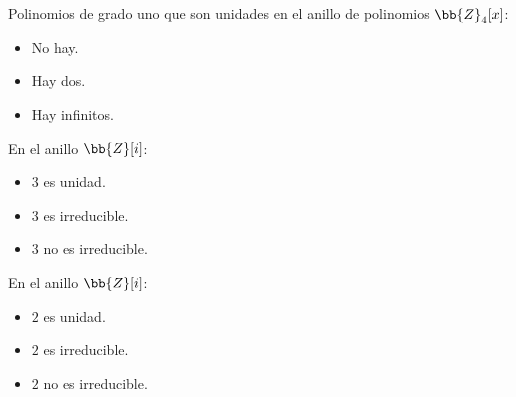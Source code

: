 \documentclass[12pt]{article}
\newcounter{ejercicio}[section] %
\newcounter{ejercicio}
\begin{document}
    \begin{ejercicio}
        Polinomios de grado uno que son unidades en el anillo de polinomios $\bb{Z}_4[x]$:
        \begin{itemize}
            \item No hay.
            \item Hay dos.
            \item Hay infinitos.
        \end{itemize}
    \end{ejercicio}

    \begin{ejercicio}
        En el anillo $\bb{Z}[i]$:
        \begin{itemize}
            \item $3$ es unidad.
            \item $3$ es irreducible.
            \item $3$ no es irreducible.
        \end{itemize}
    \end{ejercicio}

    \begin{ejercicio}
        En el anillo $\bb{Z}[i]$:
        \begin{itemize}
            \item $2$ es unidad.
            \item $2$ es irreducible.
            \item $2$ no es irreducible.
        \end{itemize}
    \end{ejercicio}
\end{document}
